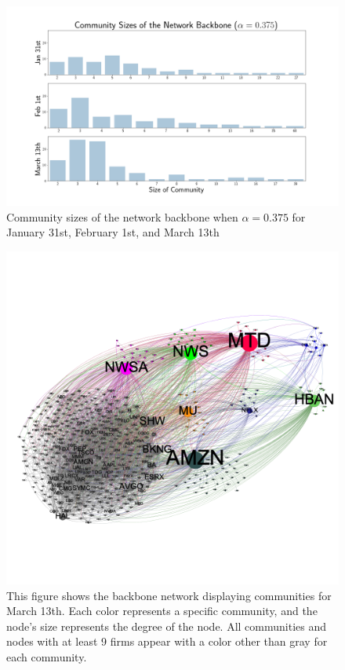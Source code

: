 \begin{figure}
  \centerline{\includegraphics[scale=0.4]{figures/EarnAnnounceTE/NetworkBackboneCommunitySizes.png}}
  \caption{Community sizes of the network backbone when $\alpha=0.375$ for January 31st,  February 1st,  and March 13th}
  \label{fig:NetworkBackboneCommunitySizes}
\end{figure}


\begin{figure}[htb!]
  \centerline{\includegraphics[scale=0.5]{figures/EarnAnnounceTE/20180313mt-8colored-curved}}
  \caption{This figure shows the backbone network displaying communities for March 13th.  Each color represents a specific community, and the node's size represents the degree of the node.  All communities and nodes with at least 9 firms appear with a color other than gray for each community. }
  \label{fig:Community20180313full}
\end{figure}


